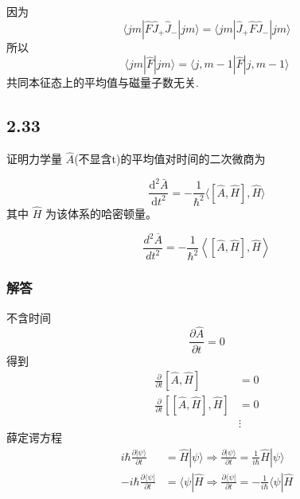 因为
\begin{equation}
     \langle jm|\hat{F}\hat{J}_+\hat{J}_-|jm\rangle =\langle jm|\hat{J}_+\hat{F}\hat{J}_-|jm\rangle 
\end{equation}
所以
\begin{equation}
    \langle jm|\hat{F}|jm\rangle =\langle j,m-1|\hat{F}|j,m-1\rangle  
\end{equation}
共同本征态上的平均值与磁量子数无关.



\newpage
\subsection{2.33}
证明力学量 $\hat{A}$(不显含t)的平均值对时间的二次微商为

$$\frac{\mathrm{d}^2\bar{A}}{\mathrm{d}t^2}=-\frac{1}{\hbar ^2}\langle [\hat{A},\hat{H}],\hat{H}\rangle $$
其中 $\hat{H}$ 为该体系的哈密顿量。


$$\frac{d^2\overline{A}}{dt^2} = -\frac{1}{\hbar^2} \left\langle \left[ \hat{A}, \hat{H} \right], \hat{H} \right\rangle$$

\subsubsection{解答}

不含时间
\begin{equation}
    \frac{\partial \hat{A}}{\partial t}=0
\end{equation}
得到
\begin{equation}
    \begin{aligned}
        \frac{\partial}{\partial t}[\hat{A},\hat{H}]&=0
\\
\frac{\partial}{\partial t}[[\hat{A},\hat{H}],\hat{H}]&=0
\\
&\vdots 
    \end{aligned}
\end{equation}
薛定谔方程
\begin{equation}
    \begin{aligned}
        i\hbar \frac{\partial |\psi \rangle}{\partial t}&=\hat{H}|\psi \rangle \Rightarrow \frac{\partial |\psi \rangle}{\partial t}=\frac{1}{i\hbar}\hat{H}|\psi \rangle 
\\
-i\hbar \frac{\partial \langle \psi |}{\partial t}&=\langle \psi |\hat{H}\Rightarrow \frac{\partial \langle \psi |}{\partial t}=-\frac{1}{i\hbar}\langle \psi |\hat{H}
    \end{aligned}
\end{equation}

